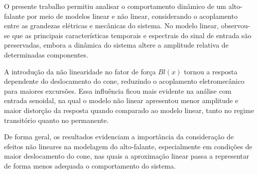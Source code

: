O presente trabalho permitiu analisar o comportamento dinâmico de um alto-falante por meio de modelos linear e não linear, considerando o acoplamento entre as grandezas elétricas e mecânicas do sistema. No modelo linear, observou-se que as principais características temporais e espectrais do sinal de entrada são preservadas, embora a dinâmica do sistema altere a amplitude relativa de determinadas componentes.

A introdução da não linearidade no fator de força \(Bl(x)\) tornou a resposta dependente do deslocamento do cone, reduzindo o acoplamento eletromecânico para maiores excursões. Essa influência ficou mais evidente na análise com entrada senoidal, na qual o modelo não linear apresentou menor amplitude e maior distorção da resposta quando comparado ao modelo linear, tanto no regime transitório quanto no permanente.

De forma geral, os resultados evidenciam a importância da consideração de efeitos não lineares na modelagem do alto-falante, especialmente em condições de maior deslocamento do cone, nas quais a aproximação linear passa a representar de forma menos adequada o comportamento do sistema.